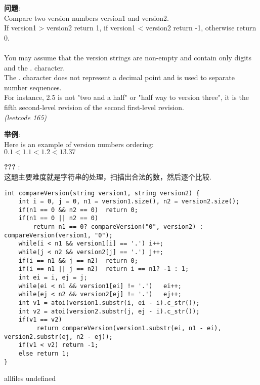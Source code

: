 \documentclass{article}
\begin{document}
\begin{CJK}{UTF8}{gbsn}     %

\else
    
\begin{description}
    \item{\textbf{问题}}: \\
Compare two version numbers version1 and version2. \\
If version1 > version2 return 1, if version1 < version2 return -1, otherwise return 0. \\
\\
You may assume that the version strings are non-empty and contain only digits and the . character. \\
The . character does not represent a decimal point and is used to separate number sequences. \\
For instance, 2.5 is not "two and a half" or "half way to version three", it is the fifth second-level revision of the second first-level revision. \\
\textit{(leetcode 165)}
    \item{\textbf{举例}}: \\
Here is an example of version numbers ordering: \\
$0.1 < 1.1 < 1.2 < 13.37$
    \item{\textbf{???}} : 
    \\这题主要难度就是字符串的处理，扫描出合法的数，然后逐个比较.
    \begin{lstlisting}
int compareVersion(string version1, string version2) {
	int i = 0, j = 0, n1 = version1.size(), n2 = version2.size();
	if(n1 == 0 && n2 == 0)	return 0;
	if(n1 == 0 || n2 == 0)	
		return n1 == 0? compareVersion("0", version2) : compareVersion(version1, "0");
	while(i < n1 && version1[i] == '.')	i++;
	while(j < n2 && version2[j] == '.')	j++;
	if(i == n1 && j == n2)	return 0;
	if(i == n1 || j == n2)	return i == n1? -1 : 1;
	int ei = i, ej = j;
	while(ei < n1 && version1[ei] != '.')	ei++;
	while(ej < n2 && version2[ej] != '.')	ej++;
	int v1 = atoi(version1.substr(i, ei - i).c_str());
	int v2 = atoi(version2.substr(j, ej - i).c_str());
	if(v1 == v2)
		 return compareVersion(version1.substr(ei, n1 - ei), version2.substr(ej, n2 - ej));
	if(v1 < v2)	return -1;
	else return 1;
}
    \end{lstlisting}
\end{description}

\fi

\ifx allfiles undefined
\end{CJK}
\end{document}
